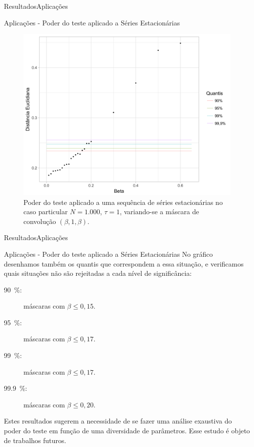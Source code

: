 \documentclass[10pt,xcolor={dvipsnames}]{beamer}
\begin{document}
\begin{frame}{Resultados}{Aplicações}
	\begin{block}{Aplicações - Poder do teste aplicado a Séries Estacionárias}
	\begin{figure}
		\centering
		\includegraphics[width=.65\linewidth]{beta_1k_D6_t1}
		\caption{Poder do teste aplicado a uma sequência de séries estacionárias no caso particular $N=1.000$, $\tau=1$, variando-se a máscara de convolução $(\beta,1,\beta)$.}\label{Fig:beta}
	\end{figure}	
	\end{block}
\end{frame}

\begin{frame}{Resultados}{Aplicações}
	\begin{block}{Aplicações - Poder do teste aplicado a Séries Estacionárias}
	No gráfico desenhamos também os quantis que correspondem a essa situação, e verificamos quais situações não são rejeitadas a cada nível de significância:
	\pause
	\begin{description}
		\item[\SI{90}{\percent}:] máscaras com $\beta\leq 0,15$.
		\item[\SI{95}{\percent}:] máscaras com $\beta\leq 0,17$.
		\item[\SI{99}{\percent}:] máscaras com $\beta\leq 0,17$.
		\item[\SI{99,9}{\percent}:] máscaras com $\beta\leq 0,20$.
	\end{description}
	\pause
	Estes resultados sugerem a necessidade de se fazer uma análise exaustiva do poder do teste em função de uma diversidade de parâmetros.
	Esse estudo é objeto de trabalhos futuros.
	\end{block}
\end{frame}
\end{document}
